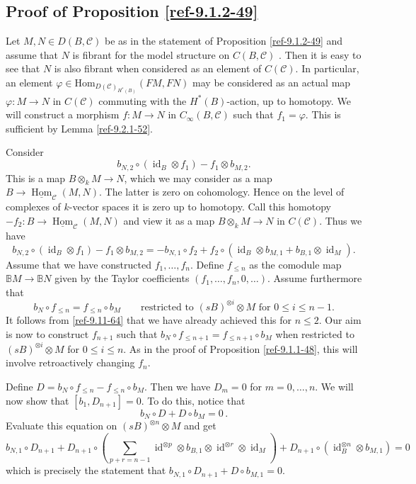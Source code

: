 \documentclass{amsart}
\numberwithin{equation}{section}
\let\cal\mathcal
\theoremstyle{definition}
\theoremstyle{remark}
\let\mathscr\mathcal
\begin{document}
\subsection{Proof of Proposition \ref{ref-9.1.2-49}} 
Let $M,N\in D(B, \mathscr{C})$ be as in the statement of Proposition \ref{ref-9.1.2-49} and
assume that $N$ is fibrant for the model structure on $C(B,{{\cal C}})$ \cite[Prop.\ 5.1]{lowenvdb2}.
Then it is easy to see that $N$ is also fibrant when considered as an element of $C({{\cal C}})$.
In particular,  an element $\varphi \in \text{Hom}_{D(\mathscr{C})_{H^*(B)}}(FM,FN)$ may be considered as an actual map $\varphi:M{\rightarrow} N$ in $C({{\cal C}})$ commuting 
with the $H^\ast(B)$-action, up to homotopy.
We  will construct a morphism   $f:M\to N$ in $C_\infty(B,{{\cal C}})$ such that $f_1=\varphi$.   This is sufficient by Lemma \ref{ref-9.2.1-52}. 

Consider 
\[
b_{N,2}\circ ({{\operatorname {id}}}_B\otimes f_1)-f_1\otimes b_{M,2}.
\]
This is a map $B\otimes_k M{\rightarrow} N$, which we may consider as a map $B{\rightarrow} \underline{\operatorname {Hom}}_{{\cal C}}(M,N)$. The latter
is zero on cohomology.  Hence on the level of complexes of $k$-vector spaces it is zero up to homotopy. Call this homotopy $-f_2:B{\rightarrow} \underline{\operatorname {Hom}}_{{\cal C}}(M,N)$ and view it
as a map $B\otimes_k M{\rightarrow} N$ in $C({{\cal C}})$. Thus we have
\begin{equation}
\label{ref-9.11-64}
b_{N,2}\circ ({{\operatorname {id}}}_B\otimes f_1)-f_1\otimes b_{M,2}=-b_{N,1} \circ f_2 + f_2\circ ({\operatorname{id}}_B\otimes b_{M,1}+b_{B,1}\otimes {\operatorname{id}}_M).
\end{equation}
Assume that we have constructed $f_1,\ldots,f_n$. Define $f_{\leq n}$ as the comodule map ${\mathbb{B}} M{\rightarrow} {\mathbb{B}} N$ given by the Taylor coefficients $(f_1,\ldots, f_n,0,\ldots)$.
Assume furthermore that 
\begin{equation}
\label{ref-9.12-65}
b_N\circ f_{\le n}=f_{\le n} \circ b_M\qquad \text{restricted to $(sB)^{\otimes i}\otimes M$ for $0\le i\le n-1$} .
\end{equation}
It follows from \eqref{ref-9.11-64} that we have already achieved this for $n\le 2$.
Our aim is now to construct $f_{n+1}$ such that $b_N\circ f_{\le n+1}=f_{\le n+1} \circ b_M$ 
when restricted to $(sB)^{\otimes i}\otimes M$ for $0\le i\le n$. As in the proof of Proposition \ref{ref-9.1.1-48}, this will involve
retroactively changing $f_n$.

Define $D=b_N\circ f_{\leq n}-f_{\leq n}\circ b_M$. Then we have $D_m=0$ for $m=0, \ldots, n$. We will now show that $[b_1,D_{n+1}]=0$. To do this, notice that  
\[b_N\circ D+ D\circ b_M=0\,.\]
Evaluate this equation on $(sB)^{\otimes n}\otimes M$ and get
\begin{equation}\label{ref-9.13-66}
b_{N,1}\circ D_{n+1}+ D_{n+1}\circ \left( \sum_{p+r=n-1} {{\operatorname {id}}}^{\otimes p}\otimes b_{B,1}\otimes {{\operatorname {id}}}^{\otimes r}\otimes {{\operatorname {id}}}_M\right) +D_{n+1}\circ ({{\operatorname {id}}}_B^{\otimes n}\otimes b_{M,1})=0
\end{equation}
which is precisely the statement that $b_{N,1}\circ D_{n+1}+ D\circ b_{M,1} =0$. 
\end{document}

